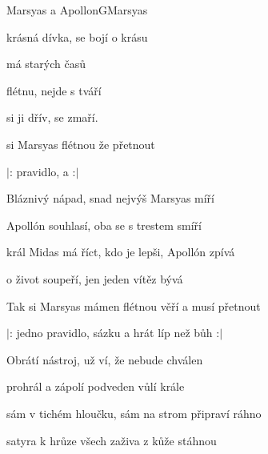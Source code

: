 \setcounter{page}{50}
\begin{song}{Marsyas a Apollon}{G}{Marsyas}

\begin{SBVerse}

 krásná dívka,  se bojí o  krásu

  má  starých  časů

 flétnu,  nejde s  tváří

 si ji  dřív,  se  zmaří.

\end{SBVerse}

\begin{SBChorus}

si Marsyas  flétnou  že  přetnout

$|$:  pravidlo,  a     :$|$

\end{SBChorus}

\begin{SBVerse}

Bláznivý nápad, snad nejvýš Marsyas míří

Apollón souhlasí, oba se s trestem smíří

král Midas má říct, kdo je lepši, Apollón zpívá

o život soupeří, jen jeden vítěz bývá

\end{SBVerse}

\begin{SBChorus}

Tak si Marsyas mámen flétnou věří a musí přetnout

$|$: jedno pravidlo, sázku a hrát líp než bůh :$|$

\end{SBChorus}

\begin{SBVerse}

Obrátí nástroj, už ví, že nebude chválen

prohrál a zápolí podveden vůlí krále

sám v tichém hloučku, sám na strom připraví ráhno

satyra k hrůze všech zaživa z kůže stáhnou

\end{SBVerse}


\end{song}
